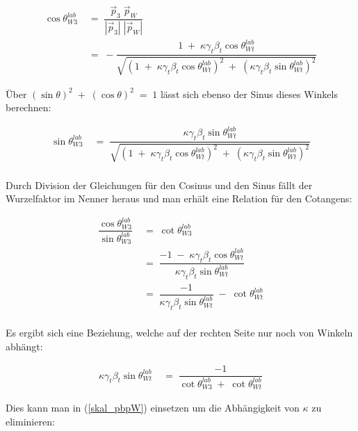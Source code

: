 \documentclass[
a4paper,                                %
twoside,                                %
BCOR1.4cm,                      %
ngerman,                                %
10pt,                           %
headings=normal,                %
headsepline,                    %
clearplainpage, %
final,                                  %
div=14,
parskip=full
]{scrbook}
\begin{document}
\begin{align}
	\cos \theta_{W3}^{lab}
\;&=\;
	\dfrac{\vec{p}_{3}\;\vec{p}_{W}}{|\vec{p}_{3}|\;|\vec{p}_{W}|}
\nonumber
\\
\;&=\;
	-\dfrac{1\;+\;\kappa \gamma_{t} \beta_{t} \cos \theta_{Wt}^{lab}}
		{\sqrt{
				\left(1\;+
				\;\kappa \gamma_{t} \beta_{t} \cos \theta_{Wt}^{lab}\right)^{2}
				\;+\;\left(\kappa \gamma_{t} \beta_{t} 
				\sin \theta_{Wt}^{lab}\right)^{2} 
			}
		}
\label{costhetaWblab}
\end{align} 

\"Uber 
$ \left(\sin \theta\right)^{2}
\;+\;\left(\cos \theta\right)^{2}\;=\;1 $
l\"asst sich ebenso der Sinus dieses Winkels berechnen:

\begin{align}
	\sin \theta_{W3}^{lab}
\;&=\;
	\dfrac{\kappa \gamma_{t} \beta_{t} \sin \theta_{Wt}^{lab}}
		{\sqrt{
				\left(1\;+
				\;\kappa \gamma_{t} \beta_{t} \cos \theta_{Wt}^{lab}\right)^{2}
				\;+\;\left(\kappa \gamma_{t} \beta_{t} 
				\sin \theta_{Wt}^{lab}\right)^{2} 
			}
		}
\nonumber
\\
\nonumber
\end{align} 

Durch Division der Gleichungen f\"ur den Cosinus und den Sinus f\"allt der Wurzelfaktor im Nenner heraus und man erh\"alt eine Relation f\"ur den Cotangens:

\begin{align}
	\dfrac{\cos \theta_{W3}^{lab}}{\sin \theta_{W3}^{lab}}
\;&=\;
	\cot \theta_{W3}^{lab}
\nonumber
\\
\;&=\;
	\dfrac{-1\;-\;\kappa \gamma_{t} \beta_{t} \cos \theta_{Wt}^{lab}}
	{\kappa \gamma_{t} \beta_{t} \sin \theta_{Wt}^{lab}}
\nonumber
\\
\;&=\;
	\dfrac{-1}{\kappa \gamma_{t} \beta_{t} \sin \theta_{Wt}^{lab}}
	\;-\;\cot \theta_{Wt}^{lab}
\nonumber
\\
\nonumber
\end{align}

Es ergibt sich eine Beziehung, welche auf der rechten Seite nur noch von Winkeln abh\"angt:

\begin{align}
	\kappa \gamma_{t} \beta_{t} \sin \theta_{Wt}^{lab}
\;&=\;
	\dfrac{-1}{\cot \theta_{W3}^{lab}\;+\;\cot \theta_{Wt}^{lab}}
\label{cot}
\end{align}

Dies kann man in (\ref{skal_pbpW}) einsetzen um die Abh\"angigkeit von $ \kappa $ zu eliminieren:
\end{document}
